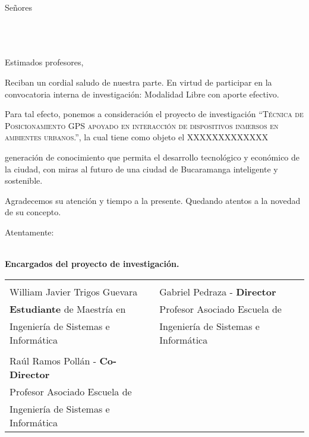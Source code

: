 \documentclass{letter} %
\begin{document}
\newcommand{\Firmas}{
\textbf{Encargados del proyecto de investigación.}
\vspace{1.2cm}

\begin{tabular}{@{}p{7.5cm}p{7.5cm}@{}}
	\dotfill & \dotfill \\ %
	\small William Javier Trigos Guevara 		& \small Gabriel Pedraza - \textbf{Director}\\
	\small \textbf{Estudiante} de Maestría en 				& \small Profesor Asociado Escuela de \\
	\small Ingeniería de Sistemas e Informática	& \small Ingeniería de Sistemas e Informática\\
	[2.5\bigskipamount]
  	\dotfill \\
  	Raúl Ramos Pollán - \textbf{Co-Director}\\
	Profesor Asociado Escuela de \\
	Ingeniería de Sistemas e Informática
\end{tabular}
}


\longindentation=0pt                       %
\let\raggedleft\raggedright                %


\begin{letter}{Señores\\
\Destinatario \\
\DirDestinatario\\
\institucion\\
\vspace{0.7cm}
}

\Encabezado



\opening{Estimados profesores,} 

Reciban un cordial saludo de nuestra parte. En virtud de participar en la convocatoria interna de investigación: Modalidad Libre con aporte efectivo.

Para tal efecto, ponemos a consideración el proyecto de investigación \textsc{“Técnica de Posicionamiento GPS apoyado en interacción de dispositivos inmersos en ambientes urbanos.”}, la cual tiene como objeto el XXXXXXXXXXXXX

generación de conocimiento que permita el desarrollo tecnológico y económico de la ciudad, con miras al futuro de una ciudad de Bucaramanga inteligente y sostenible.

Agradecemos su atención y tiempo a la presente. Quedando atentos a la novedad de su concepto.


\vspace{0.5cm}
Atentamente: 

\FirmasUAA\\

\Firmas

\end{letter}
\end{document}
